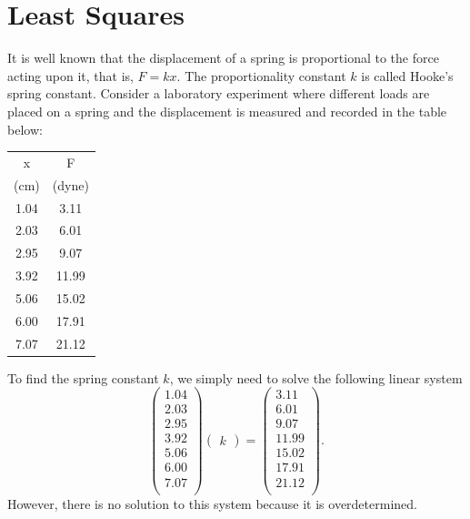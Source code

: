 \section*{Least Squares}

It is well known that the displacement of a spring is proportional
to the force acting upon it, that is, $F = k x$.  The proportionality
constant $k$ is called Hooke's spring constant.  Consider a laboratory
experiment where different loads are placed on a spring and the displacement
is measured and recorded in the table below:
\vspace{5mm}\\
\begin{center}
\begin{tabular}{|c|c|}
	\hline
x & F \\
(cm) & (dyne)\\
\hline
1.04  & 3.11 \\
2.03  &  6.01\\
2.95  &  9.07\\
3.92  &  11.99\\
5.06  &  15.02\\
6.00  &  17.91\\
7.07  &  21.12\\
\hline
\end{tabular}
\end{center}
\vspace{5mm}
To find the spring constant $k$, we simply need to solve the following linear system
\[
\begin{pmatrix}
1.04\\
2.03\\
2.95\\
3.92\\
5.06\\
6.00\\
7.07\\
\end{pmatrix}
\begin{pmatrix}k\end{pmatrix} =
\begin{pmatrix}
3.11 \\
6.01\\
9.07\\
11.99\\
15.02\\
17.91\\
21.12\\
\end{pmatrix}.
\]
However, there is no solution to this system because it is overdetermined.
